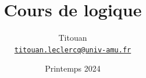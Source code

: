 \title{Cours de logique}
\author{%
	Titouan \\%
	\href{mailto:titouan.leclercq@univ-amu.fr}{\texttt{titouan.leclercq@univ-amu.fr}}%
}
\date{Printemps 2024}

